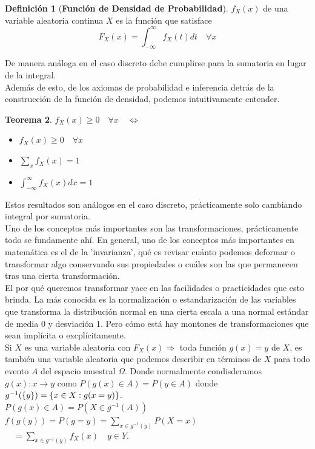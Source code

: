 \documentclass[11pt,a4paper,oneside]{report}
\theoremstyle{definition}
\newtheorem{definicion}{Definición}[chapter]
\theoremstyle{plain}
\newtheorem{teorema}[definicion]{Teorema}
\theoremstyle{remark}
\DeclarePairedDelimiter{\conj}{\{}{\}}
\newcommand{\termino}[1]{\textbf{#1}\index{#1}}
\begin{document}
\begin{definicion}[\termino{Función de Densidad de Probabilidad}]
  $f_X(x)$ de una variable aleatoria continua $X$ es la función que satisface
  \[ F_X(x)=\int_{-\infty}^{\infty}f_X(t) dt \quad \forall x\]
\end{definicion}
De manera análoga en el caso discreto debe cumplirse para la sumatoria en lugar de la integral.\\
Además de esto, de los axiomas de probabilidad e inferencia detrás de la construcción de la función de 
densidad, podemos intuitivamente entender.
\begin{teorema}
  $f_X(x)\geq 0 \quad \forall x \quad \iff$
  \begin{itemize}
    \item $f_X(x) \geq 0 \quad \forall x$
    \item $\sum_{x}f_X(x)=1$
    \item $\int_{-\infty}^{\infty}f_X(x)dx=1$
  \end{itemize}
\end{teorema}
Estos resultados son análogos en el caso discreto, prácticamente solo cambiando integral por sumatoria.\\
Uno de los conceptos más importantes son las transformaciones, prácticamente todo se fundamente ahí. En general,
uno de los conceptos más importantes en matemática es el de la 'invarianza', qué es revisar cuánto podemos deformar 
o transformar algo conservando sus propiedades o cuáles son las que permanecen tras una cierta transformación.\\
El por qué queremos transformar yace en las facilidades o practicidades que esto brinda. La más conocida es la
normalización o estandarización de las variables que transforma la distribución normal en una cierta escala a una
normal estándar de media 0 y desviación 1. Pero cómo está hay montones de transformaciones que sean implícita o 
excplícitamente.\\
Si $X$ es una variable aleatoria con $F_X(x)\Rightarrow$ toda función $g(x)=y$ de $X$, es también una variable aleatoria 
que podemos describir en términos de $X$ para todo evento $A$ del espacio muestral $\Omega$. Donde normalmente condisderamos
$g(x):x\rightarrow y $ como $P(g(x)\in A)=P(y\in A)$ donde $g^{-1}(\conj{y})=\conj{x\in X: g(x=y)}$.\\
$P(g(x)\in A)=P(X\in g^{-1}(A))$\\
$f(g(y))=P(g=y)=\sum_{x\in g^{-1}(y)}P(X=x)$\\
$\quad =\sum_{x\in g^{-1}(y)}f_X(x) \quad y\in Y$.\\
\end{document}
